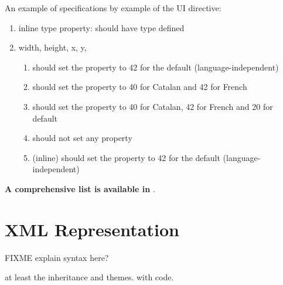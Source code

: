 An example of specifications by example of  the UI directive:
\begin{enumerate}
	\item inline type property: should have type defined
	\item width, height, x, y, 
		\begin{enumerate}
			\item should set the property to 42 for the default (language-independent)
			\item should set the property to 40 for Catalan and 42 for French
			\item should set the property to 40 for Catalan, 42 for French and 20 for default
			\item should not set any property
			\item (inline) should set the property to 42 for the default (language-independent)
		\end{enumerate}
\end{enumerate}

\textbf{A comprehensive list is available in }.

\section{XML Representation}
FIXME explain syntax here?

at least the inheritance and themes. with code.
